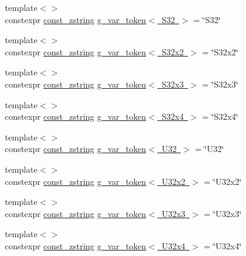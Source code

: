 \begin{DoxyCompactItemize}
{\footnotesize template$<$$>$ }\\constexpr \mbox{\hyperlink{namespacemage_abfd9206dc607ceb5d13ec68bf075a5c0}{const\+\_\+zstring}} \mbox{\hyperlink{namespacemage_1_1loader_adc4b1d2ff450d4683918426296232d2c}{g\+\_\+var\+\_\+token$<$ S32 $>$}} = \char`\"{}S32\char`\"{}
\item 
{\footnotesize template$<$$>$ }\\constexpr \mbox{\hyperlink{namespacemage_abfd9206dc607ceb5d13ec68bf075a5c0}{const\+\_\+zstring}} \mbox{\hyperlink{namespacemage_1_1loader_a47ee1a5bab16e86d014a3e203e6f117a}{g\+\_\+var\+\_\+token$<$ S32x2 $>$}} = \char`\"{}S32x2\char`\"{}
\item 
{\footnotesize template$<$$>$ }\\constexpr \mbox{\hyperlink{namespacemage_abfd9206dc607ceb5d13ec68bf075a5c0}{const\+\_\+zstring}} \mbox{\hyperlink{namespacemage_1_1loader_aa6d75fe62fb95231a21055e829a99cac}{g\+\_\+var\+\_\+token$<$ S32x3 $>$}} = \char`\"{}S32x3\char`\"{}
\item 
{\footnotesize template$<$$>$ }\\constexpr \mbox{\hyperlink{namespacemage_abfd9206dc607ceb5d13ec68bf075a5c0}{const\+\_\+zstring}} \mbox{\hyperlink{namespacemage_1_1loader_ad6fee44f06cd254cbde79f39e27baf93}{g\+\_\+var\+\_\+token$<$ S32x4 $>$}} = \char`\"{}S32x4\char`\"{}
\item 
{\footnotesize template$<$$>$ }\\constexpr \mbox{\hyperlink{namespacemage_abfd9206dc607ceb5d13ec68bf075a5c0}{const\+\_\+zstring}} \mbox{\hyperlink{namespacemage_1_1loader_a266bfa6fe8dc1de0b589e6b30d5e13ac}{g\+\_\+var\+\_\+token$<$ U32 $>$}} = \char`\"{}U32\char`\"{}
\item 
{\footnotesize template$<$$>$ }\\constexpr \mbox{\hyperlink{namespacemage_abfd9206dc607ceb5d13ec68bf075a5c0}{const\+\_\+zstring}} \mbox{\hyperlink{namespacemage_1_1loader_a63ff7dfc7168dd564a7706d3170fd356}{g\+\_\+var\+\_\+token$<$ U32x2 $>$}} = \char`\"{}U32x2\char`\"{}
\item 
{\footnotesize template$<$$>$ }\\constexpr \mbox{\hyperlink{namespacemage_abfd9206dc607ceb5d13ec68bf075a5c0}{const\+\_\+zstring}} \mbox{\hyperlink{namespacemage_1_1loader_a10f4eff4894004a57bcacb1863982b6c}{g\+\_\+var\+\_\+token$<$ U32x3 $>$}} = \char`\"{}U32x3\char`\"{}
\item 
{\footnotesize template$<$$>$ }\\constexpr \mbox{\hyperlink{namespacemage_abfd9206dc607ceb5d13ec68bf075a5c0}{const\+\_\+zstring}} \mbox{\hyperlink{namespacemage_1_1loader_af6edc0f8296394a7e88da46a8720ee9e}{g\+\_\+var\+\_\+token$<$ U32x4 $>$}} = \char`\"{}U32x4\char`\"{}
\end{DoxyCompactItemize}


